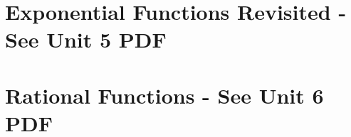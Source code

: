 \documentclass[handout]{xourse}
\begin{document}
\part{Exponential Functions Revisited - See Unit 5 PDF}
%
%
%
%




\part{Rational Functions - See Unit 6 PDF}


%
%
%
%




\end{document}
